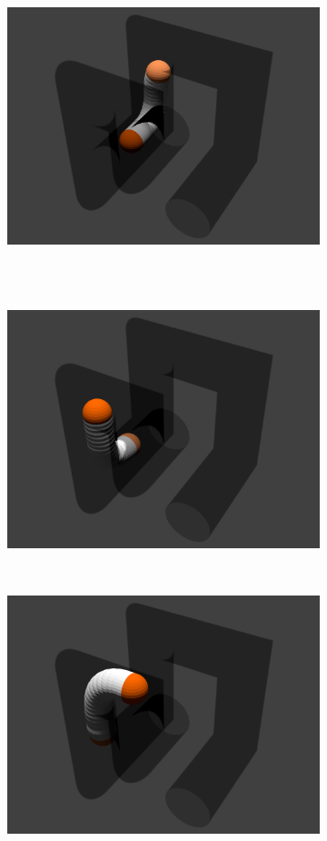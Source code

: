 \documentclass[12pt,a4]{article}
\begin{document}
\begin{figure}[ht!]
\begin{subfigure}{0.31\textwidth}
    \end{subfigure}%
    ~
        \begin{subfigure}{0.31\textwidth}
        \centering
        \includegraphics[width=0.8\linewidth]{figures/Pipesnaps/3.png}
      
    \end{subfigure}%
    \\~\\
    
       \begin{subfigure}{0.31\textwidth}
        \centering
        \includegraphics[width=0.8\linewidth]{figures/Pipesnaps/4.png}
       
    \end{subfigure}%
    ~
        \begin{subfigure}{0.31\textwidth}
        \centering
        \includegraphics[width=0.8\linewidth]{figures/Pipesnaps/5.png}
      

\end{subfigure}
\end{figure}
\end{document}
